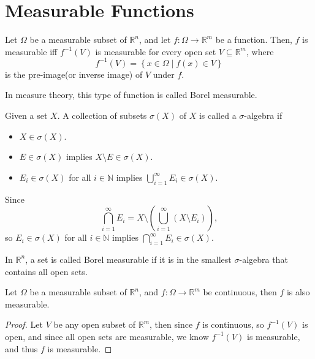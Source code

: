 \section{Measurable Functions}
\begin{definition}
    Let \(\Omega \) be a measurable subset of \(\mathbb{R} ^n\), and let \(f: \Omega \to \mathbb{R} ^m\) be a function. Then, \(f\) is measurable iff \(f^{-1}(V)\) is measurable for every open set \(V \subseteq \mathbb{R} ^m\), where 
    \[
        f^{-1}(V) = \left\{ x \in \Omega \mid f(x) \in V \right\} 
    \]
    is the pre-image(or inverse image) of \(V\) under \(f\).      
\end{definition}

\begin{remark}
    In measure theory, this type of function is called Borel measurable.  
\end{remark}

\begin{definition}
    Given a set \(X\). A collection of subsets \(\sigma (X)\) of \(X\) is called a \(\sigma \)-algebra if 
    \begin{itemize}
        \item [(1)] \(X \in \sigma (X)\). 
        \item [(2)] \(E \in \sigma (X)\) implies \(X \setminus E \in \sigma (X)\).
        \item [(3)] \(E_i \in \sigma (X)\) for all \(i \in \mathbb{N}\) implies \(\bigcup_{i=1}^{\infty} E_i \in \sigma (X) \). 
    \end{itemize} 
\end{definition}

\begin{remark}
    Since 
    \[
        \bigcap_{i=1}^{\infty} E_i = X \setminus \left( \bigcup_{i=1}^{\infty} (X \setminus E_i)  \right),  
    \]
    so \(E_i \in \sigma (X)\) for all \(i \in \mathbb{N}\) implies \(\bigcap_{i=1}^{\infty} E_i \in \sigma (X) \).  
\end{remark}

\begin{definition}
    In \(\mathbb{R} ^n\), a set is called Borel measurable if it is in the smallest \(\sigma\)-algebra that contains all open sets.  
\end{definition}

\begin{lemma}
    Let \(\Omega \) be a measurable subset of \(\mathbb{R} ^n\), and \(f: \Omega \to \mathbb{R} ^m\) be continuous, then \(f\) is also measurable.    
\end{lemma}
\begin{proof}
    Let \(V\) be any open subset of \(\mathbb{R} ^m\), then since \(f\) is continuous, so \(f^{-1} (V)\) is open, and since all open sets are measurable, we know \(f^{-1}(V)\) is measurable, and thus \(f\) is measurable.      
\end{proof}


